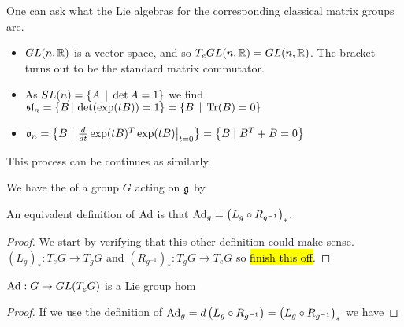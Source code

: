 \documentclass{article}
\begin{document}
\begin{example} 
One can ask what the Lie algebras for the corresponding classical matrix groups are. 
\begin{itemize}
    \item $GL(n,\mathbb{R})$ is a vector space, and so $T_e GL(n,\mathbb{R}) = GL(n,\mathbb{R})$. The bracket turns out to be the standard matrix commutator. 
    \item As $SL(n) = \left\{ A \, \mid \, \det A = 1 \right\}$ we find $\mathfrak{sl}_n = \left\{ B \, | \, \det(\exp(tB)) = 1 \right\} = \left\{ B \, \mid \, \operatorname{Tr}(B) = 0 \right\}$
    \item $\mathfrak{o}_n = \left\{ B  \mid  \left. \frac{d}{dt} \exp(tB)^T \exp(tB) \right\rvert_{t=0} \right\} = \left\{ B  \mid B^T + B = 0  \right\}$
\end{itemize}
This process can be continues as similarly. 
\end{example}

\begin{definition}
We have the  of a group $G$ acting on $\mathfrak{g}$ by 
\end{definition}

\begin{prop}
	An equivalent definition of $\operatorname{Ad}$ is that $\operatorname{Ad}_g = \left( L_g \circ R_{g^{-1}} \right)_\ast $. 
\end{prop}
\begin{proof}
	We start by verifying that this other definition could make sense. $(L_g)_\ast : T_eG \to T_g G$ and $(R_{g^{-1}})_\ast : T_g G \to T_e G$ so 
\hl{finish this off}.
\end{proof}

\begin{prop}
	$\operatorname{Ad} : G \to GL(T_e G)$ is a Lie group hom
\end{prop}
\begin{proof}
If we use the definition of $\operatorname{Ad}_g = d\left( L_g \circ R_{g^{-1}} \right) =\left( L_g \circ R_{g^{-1}} \right)_\ast$ we have 
\end{proof}
\end{document}
